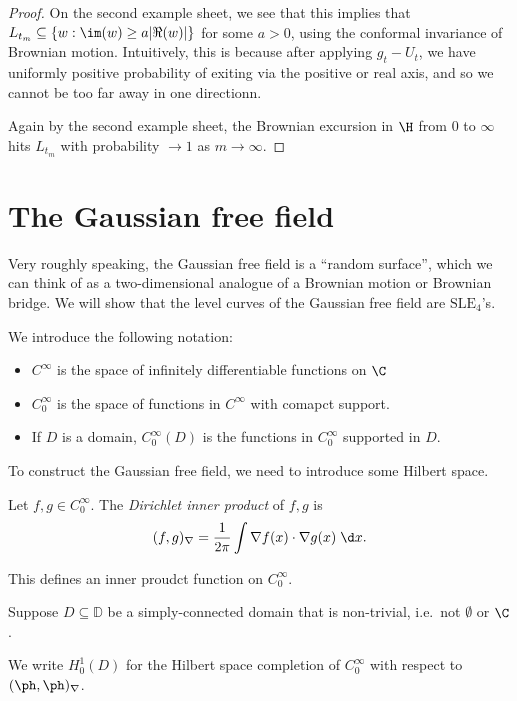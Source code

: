 \documentclass[a4paper]{article}
\renewcommand\D{\mathbb{D}}
\newcommand\SLE{\mathrm{SLE}}
\begin{document}
\begin{proof}
  On the second example sheet, we see that this implies that $L_{t_m} \subseteq \{w : \im (w) \geq a |\Re(w)|\}$ for some $a > 0$, using the conformal invariance of Brownian motion. Intuitively, this is because after applying $g_t - U_t$, we have uniformly positive probability of exiting via the positive or real axis, and so we cannot be too far away in one directionn.

  Again by the second example sheet, the Brownian excursion in $\H$ from $0$ to $\infty$ hits $L_{t_m}$ with probability $\to 1$ as $m \to \infty$.
\end{proof}

\section{The Gaussian free field}
Very roughly speaking, the Gaussian free field is a ``random surface'', which we can think of as a two-dimensional analogue of a Brownian motion or Brownian bridge. We will show that the level curves of the Gaussian free field are $\SLE_4$'s.

We introduce the following notation:
\begin{notation}\leavevmode
  \begin{itemize}
    \item $C^\infty$ is the space of infinitely differentiable functions on $\C$
    \item $C_0^\infty$ is the space of functions in $C^\infty$ with comapct support.
    \item If $D$ is a domain, $C_0^\infty(D)$ is the functions in $C_0^\infty$ supported in $D$.
  \end{itemize}
\end{notation}
To construct the Gaussian free field, we need to introduce some Hilbert space.

\begin{defi}
  Let $f, g \in C_0^\infty$. The \emph{Dirichlet inner product} of $f, g$ is
  \[
    (f, g)_\nabla = \frac{1}{2\pi}\int \nabla f(x) \cdot \nabla g(x)\;\d x.
  \]
\end{defi}
This defines an inner proudct function on $C_0^\infty$.

Suppose $D \subseteq \D$ be a simply-connected domain that is non-trivial, i.e.\ not $\emptyset$ or $\C$.

\begin{defi}[$H_0^1(D)$]
  We write $H_0^1(D)$ for the Hilbert space completion of $C_0^\infty$ with respect to $(\ph, \ph)_{\nabla}$.
\end{defi}
\end{document}
